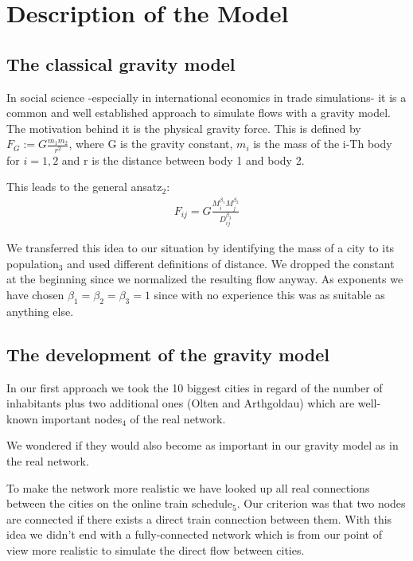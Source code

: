 \documentclass[11pt]{article}
\begin{document}
\section{Description of the Model}
\subsection{The classical gravity model}
In  social science -especially in international economics in trade simulations- it is a common and well established approach to simulate flows with a gravity model. The motivation behind it is the physical gravity force. This is defined by $F_G:=G\frac{m_1 m_2}{r^2}$, where G is the gravity constant, $m_i$ is the mass of the  i-Th body for $i=1,2$ and r is the distance between body 1 and body 2.


This leads to the general ansatz$_2$:
\begin{align*}
F_{ij}=G\frac{M_i^{\beta_1}M_j^{\beta_2}}{D_{ij}^{\beta_3}}
\end{align*}

We transferred this idea to our situation by identifying the mass of a city to its population$_3$ and used different definitions of distance. We dropped the constant at the beginning since we normalized the resulting flow anyway. As exponents we have chosen $\beta_1=\beta_2=\beta_3=1$ since with no experience this was as suitable as anything else.\newline

\subsection{The development of the gravity model}
In our first approach we took the 10  biggest cities in regard of the number of inhabitants plus two additional ones (Olten and Arthgoldau) which are well-known important nodes$_4$ of the real network.

We wondered if they would also become as important  in our gravity model as in the real network.\newline

To make the network more realistic we have looked up all real connections between the cities on the online train schedule$_5$. Our criterion was that two nodes are connected if there exists a direct train connection between them. With this idea we didn't end with a fully-connected network which is from our point of view more realistic to simulate the direct flow between cities.
\end{document}
